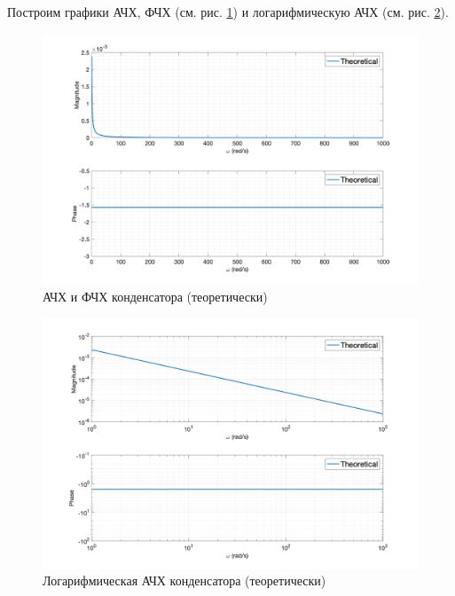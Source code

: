 Построим графики АЧХ, ФЧХ (см. рис. \ref{fig:task3_freq_resp_eq_lin}) и логарифмическую АЧХ (см. рис. \ref{fig:task3_freq_resp_eq_loglog}).
\begin{figure}[ht!]
    \centering
    \includegraphics[width=\textwidth]{media/plots/task3_freq_resp_eq_lin.png}
    \caption{АЧХ и ФЧХ конденсатора (теоретически)}
    \label{fig:task3_freq_resp_eq_lin}
\end{figure}
\begin{figure}[ht!]
    \centering
    \includegraphics[width=\textwidth]{media/plots/task3_freq_resp_eq_loglog.png}
    \caption{Логарифмическая АЧХ конденсатора (теоретически)}
    \label{fig:task3_freq_resp_eq_loglog}
\end{figure}

